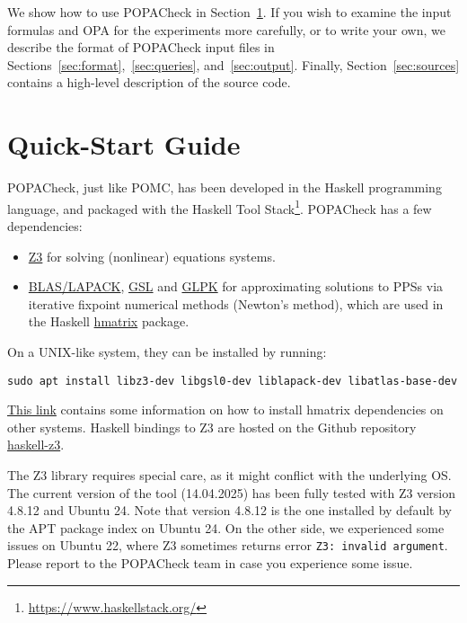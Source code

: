 \documentclass[9pt,a4paper]{article}
\begin{document}
We show how to use POPACheck in Section~\ref{sec:quick-start}.
If you wish to examine the input formulas and OPA for the experiments more carefully,
or to write your own, we describe the format of POPACheck input files in Sections~\ref{sec:format},~\ref{sec:queries}, and~\ref{sec:output}.
Finally, Section~\ref{sec:sources} contains a high-level description of the source code.

\section{Quick-Start Guide}
\label{sec:quick-start}

POPACheck, just like POMC, has been developed in the Haskell programming language,
and packaged with the Haskell Tool Stack\footnote{\url{https://www.haskellstack.org/}}.
POPACheck has a few dependencies:
\begin{itemize}
    \item \href{https://microsoft.github.io/z3guide/z3}{Z3} for solving (nonlinear) equations systems.
    \item \href{https://www.netlib.org/lapack/}{BLAS/LAPACK}, \href{ttps://www.gnu.org/software/gsl/}{GSL} and \href{https://www.gnu.org/software/glpk/}{GLPK} for approximating solutions to PPSs via iterative fixpoint numerical methods (Newton's method), which are used in the Haskell \href{https://hackage.haskell.org/package/hmatrix}{hmatrix} package.
\end{itemize}
On a UNIX-like system, they can be installed by running:
\begin{verbatim}
sudo apt install libz3-dev libgsl0-dev liblapack-dev libatlas-base-dev
\end{verbatim}

\href{https://github.com/haskell-numerics/hmatrix/blob/master/INSTALL.md}{This link} contains some information on how to install hmatrix dependencies on other systems.
Haskell bindings to Z3 are hosted on the Github repository \href{https://github.com/michiari/haskell-z3}{haskell-z3}.

The Z3 library requires special care, as it might conflict with the underlying OS. The current version of the tool (14.04.2025) has been fully tested with Z3 version 4.8.12 and Ubuntu 24. Note that version 4.8.12 is the one installed by default by the APT package index on Ubuntu 24. On the other side, we experienced some issues on Ubuntu 22, where Z3 sometimes returns error \verb|Z3: invalid argument|. Please report to the POPACheck team in case you experience some issue.
\end{document}
